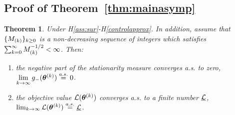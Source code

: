 \documentclass{article}
\newtheorem*{Theorem*}{Theorem}
\begin{document}
\subsection{Proof of Theorem~\ref{thm:mainasymp}}
\begin{Theorem*}
Under H\ref{ass:sur}-H\ref{controlapprox}. In addition, assume that $\{\Bsize{k}\}_{k \geq 0}$ is a non-decreasing sequence of integers which satisfies $\sum_{k=0}^{\infty}{\Bsize{k}^{-1/2}} < \infty$. Then:
\vspace{-0.08in}
\begin{enumerate}[leftmargin=.35cm]
\item the negative part of the stationarity measure converges a.s. to zero, \ie $\textstyle \lim \limits_{ k \rightarrow \infty} g_-( \hp{k})  \overset{a.s.}{=} 0$. 
\vspace{-0.1in}
\item the objective value ${\cal L} ( \hp{k} )$ converges a.s. to a finite number $\underline{\cal L}$, \ie $\lim_{k \rightarrow \infty} {\cal L} ( \hp{k} )\overset{a.s.}{=} \underline{\cal L}$.
\vspace{-0.1in}
\end{enumerate}
\end{Theorem*}
\end{document}
